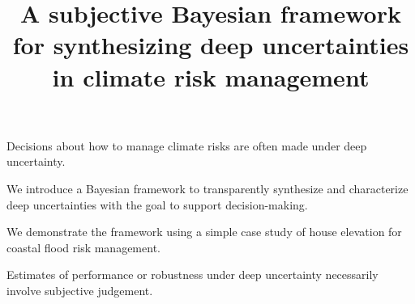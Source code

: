 \documentclass{agujournal2019}
\begin{document}
%
%


\title{A subjective Bayesian framework for synthesizing deep uncertainties in climate risk management}

%
%






\begin{keypoints}
  \item Decisions about how to manage climate risks are often made under deep uncertainty.
  \item We introduce a Bayesian framework to transparently synthesize and characterize deep uncertainties with the goal to support decision-making.
  \item We demonstrate the framework using a simple case study of house elevation for coastal flood risk management.
  \item Estimates of performance or robustness under deep uncertainty necessarily involve subjective judgement.
\end{keypoints}
\end{document}
